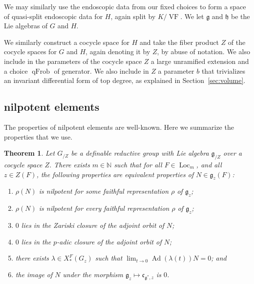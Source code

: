 \documentclass[12pt]{amsart}
\newcommand{\op}[1]{\operatorname{#1}}
\newcommand{\ring}[1]{{\mathbb #1}}
\def\VF{{\op{VF}}}
\newcommand{\fg}{\mathfrak{g}}
\newcommand{\fc}{\mathfrak{c}}
\newcommand{\fh}{\mathfrak{h}}
\theoremstyle{plain}
\newtheorem{theorem}[thm]{Theorem}
\theoremstyle{definition}
\begin{document}
We may similarly use the endoscopic data from our fixed choices to form
a space of quasi-split endoscopic data for $H$, again split by $K/\VF$.  
We let $\fg$ and $\fh$ be the Lie algebras of $G$ and $H$.

We
similarly construct a cocycle space for $H$ and take the fiber product
$Z$ of the cocycle spaces for $G$ and $H$, again denoting it by $Z$,
by abuse of notation.  We also include in the parameters of
the cocycle space $Z$ a large unramified extension and a choice
$\op{qFrob}$ of generator.
We also
include in $Z$ a parameter $b$ that trivializes an invariant
differential form of top degree, as explained in Section~\ref{sec:volume}.




\subsection{nilpotent elements}\label{sec:nilpotent}

The properties of nilpotent elements are well-known.  Here we
summarize the properties that we use.

\begin{theorem} 
  Let $G_{/Z}$ be a definable reductive group with Lie algebra
  $\fg_{/Z}$ over a cocycle space $Z$.  There exists $m\in\ring{N}$
  such that for all $F\in\op{Loc}_m$, and all $z\in Z(F)$, the
  following properties are equivalent properties of $N\in \fg_z(F)$:
\begin{enumerate}
\item $\rho(N)$ is nilpotent for {\it some} faithful representation $\rho$
 of  $\fg_z$;
\item $\rho(N)$ is nilpotent for {\it every} faithful representation $\rho$
 of  $\fg_z$;
\item $0$ lies in the Zariski closure of the adjoint orbit of $N$;
\item $0$ lies in the $p$-adic closure of the adjoint orbit of $N$;
\item there exists $\lambda\in X_*^F(G_z)$ such that $\lim_{t\to 0}
  \op{Ad}(\lambda(t))N = 0$; and
\item the image of $N$ under the morphism $\fg_z\mapsto \fc_{\fg^*,z}$
  is $0$.
\end{enumerate}
\end{theorem}
\end{document}

